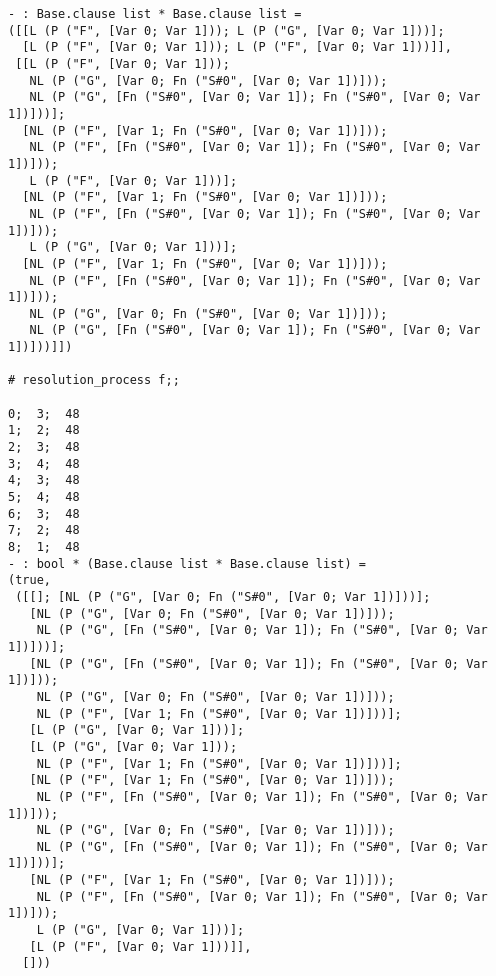 \documentclass[a4paper]{article}
\begin{document}
\begin{lstlisting}[name=interp]
- : Base.clause list * Base.clause list =
([[L (P ("F", [Var 0; Var 1])); L (P ("G", [Var 0; Var 1]))];
  [L (P ("F", [Var 0; Var 1])); L (P ("F", [Var 0; Var 1]))]],
 [[L (P ("F", [Var 0; Var 1]));
   NL (P ("G", [Var 0; Fn ("S#0", [Var 0; Var 1])]));
   NL (P ("G", [Fn ("S#0", [Var 0; Var 1]); Fn ("S#0", [Var 0; Var 1])]))];
  [NL (P ("F", [Var 1; Fn ("S#0", [Var 0; Var 1])]));
   NL (P ("F", [Fn ("S#0", [Var 0; Var 1]); Fn ("S#0", [Var 0; Var 1])]));
   L (P ("F", [Var 0; Var 1]))];
  [NL (P ("F", [Var 1; Fn ("S#0", [Var 0; Var 1])]));
   NL (P ("F", [Fn ("S#0", [Var 0; Var 1]); Fn ("S#0", [Var 0; Var 1])]));
   L (P ("G", [Var 0; Var 1]))];
  [NL (P ("F", [Var 1; Fn ("S#0", [Var 0; Var 1])]));
   NL (P ("F", [Fn ("S#0", [Var 0; Var 1]); Fn ("S#0", [Var 0; Var 1])]));
   NL (P ("G", [Var 0; Fn ("S#0", [Var 0; Var 1])]));
   NL (P ("G", [Fn ("S#0", [Var 0; Var 1]); Fn ("S#0", [Var 0; Var 1])]))]])

# resolution_process f;;

0;	3;	48
1;	2;	48
2;	3;	48
3;	4;	48
4;	3;	48
5;	4;	48
6;	3;	48
7;	2;	48
8;	1;	48
- : bool * (Base.clause list * Base.clause list) =
(true,
 ([[]; [NL (P ("G", [Var 0; Fn ("S#0", [Var 0; Var 1])]))];
   [NL (P ("G", [Var 0; Fn ("S#0", [Var 0; Var 1])]));
    NL (P ("G", [Fn ("S#0", [Var 0; Var 1]); Fn ("S#0", [Var 0; Var 1])]))];
   [NL (P ("G", [Fn ("S#0", [Var 0; Var 1]); Fn ("S#0", [Var 0; Var 1])]));
    NL (P ("G", [Var 0; Fn ("S#0", [Var 0; Var 1])]));
    NL (P ("F", [Var 1; Fn ("S#0", [Var 0; Var 1])]))];
   [L (P ("G", [Var 0; Var 1]))];
   [L (P ("G", [Var 0; Var 1]));
    NL (P ("F", [Var 1; Fn ("S#0", [Var 0; Var 1])]))];
   [NL (P ("F", [Var 1; Fn ("S#0", [Var 0; Var 1])]));
    NL (P ("F", [Fn ("S#0", [Var 0; Var 1]); Fn ("S#0", [Var 0; Var 1])]));
    NL (P ("G", [Var 0; Fn ("S#0", [Var 0; Var 1])]));
    NL (P ("G", [Fn ("S#0", [Var 0; Var 1]); Fn ("S#0", [Var 0; Var 1])]))];
   [NL (P ("F", [Var 1; Fn ("S#0", [Var 0; Var 1])]));
    NL (P ("F", [Fn ("S#0", [Var 0; Var 1]); Fn ("S#0", [Var 0; Var 1])]));
    L (P ("G", [Var 0; Var 1]))];
   [L (P ("F", [Var 0; Var 1]))]],
  []))
\end{lstlisting}
\end{document}
